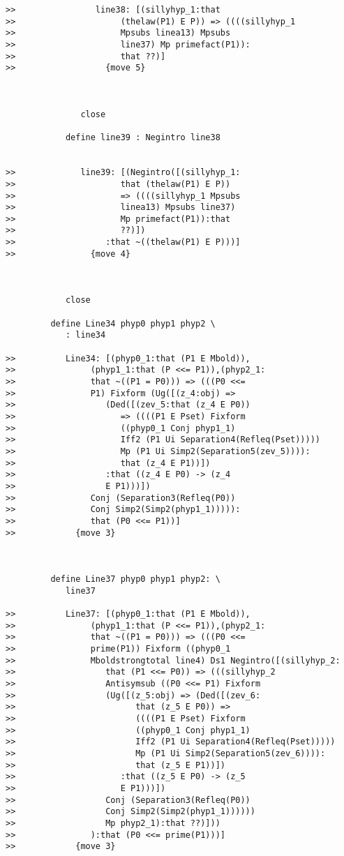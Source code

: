 \documentclass[12pt]{article}
\begin{document}
\begin{verbatim}
>>                line38: [(sillyhyp_1:that
>>                     (thelaw(P1) E P)) => ((((sillyhyp_1
>>                     Mpsubs linea13) Mpsubs
>>                     line37) Mp primefact(P1)):
>>                     that ??)]
>>                  {move 5}



               close

            define line39 : Negintro line38


>>             line39: [(Negintro([(sillyhyp_1:
>>                     that (thelaw(P1) E P))
>>                     => ((((sillyhyp_1 Mpsubs
>>                     linea13) Mpsubs line37)
>>                     Mp primefact(P1)):that
>>                     ??)])
>>                  :that ~((thelaw(P1) E P)))]
>>               {move 4}



            close

         define Line34 phyp0 phyp1 phyp2 \
            : line34

>>          Line34: [(phyp0_1:that (P1 E Mbold)),
>>               (phyp1_1:that (P <<= P1)),(phyp2_1:
>>               that ~((P1 = P0))) => (((P0 <<=
>>               P1) Fixform (Ug([(z_4:obj) =>
>>                  (Ded([(zev_5:that (z_4 E P0))
>>                     => ((((P1 E Pset) Fixform
>>                     ((phyp0_1 Conj phyp1_1)
>>                     Iff2 (P1 Ui Separation4(Refleq(Pset)))))
>>                     Mp (P1 Ui Simp2(Separation5(zev_5)))):
>>                     that (z_4 E P1))])
>>                  :that ((z_4 E P0) -> (z_4
>>                  E P1)))])
>>               Conj (Separation3(Refleq(P0))
>>               Conj Simp2(Simp2(phyp1_1))))):
>>               that (P0 <<= P1))]
>>            {move 3}



         define Line37 phyp0 phyp1 phyp2: \
            line37

>>          Line37: [(phyp0_1:that (P1 E Mbold)),
>>               (phyp1_1:that (P <<= P1)),(phyp2_1:
>>               that ~((P1 = P0))) => (((P0 <<=
>>               prime(P1)) Fixform ((phyp0_1
>>               Mboldstrongtotal line4) Ds1 Negintro([(sillyhyp_2:
>>                  that (P1 <<= P0)) => (((sillyhyp_2
>>                  Antisymsub ((P0 <<= P1) Fixform
>>                  (Ug([(z_5:obj) => (Ded([(zev_6:
>>                        that (z_5 E P0)) =>
>>                        ((((P1 E Pset) Fixform
>>                        ((phyp0_1 Conj phyp1_1)
>>                        Iff2 (P1 Ui Separation4(Refleq(Pset)))))
>>                        Mp (P1 Ui Simp2(Separation5(zev_6)))):
>>                        that (z_5 E P1))])
>>                     :that ((z_5 E P0) -> (z_5
>>                     E P1)))])
>>                  Conj (Separation3(Refleq(P0))
>>                  Conj Simp2(Simp2(phyp1_1))))))
>>                  Mp phyp2_1):that ??)]))
>>               ):that (P0 <<= prime(P1)))]
>>            {move 3}




\end{verbatim}
\end{document}
